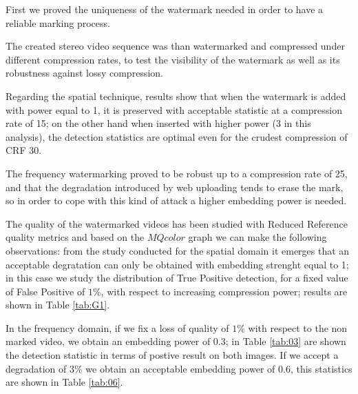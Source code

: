 First we proved the uniqueness of the watermark needed in order to have a reliable marking process.

The created stereo video sequence was than watermarked and compressed under different compression rates, to test the visibility of the watermark as well as its robustness against lossy compression.

Regarding the spatial technique, results show that when the watermark is added with power equal to 1, it is preserved with acceptable statistic at a compression rate of 15; on the other hand when inserted with higher power (3 in this analysis), the detection statistics are optimal even for the crudest compression of CRF 30. 

The frequency watermarking proved to be robust up to a compression rate of 25, and that the degradation introduced by web uploading tends to erase the mark, so in order to cope with this kind of attack a higher embedding power is needed.

The quality of the watermarked videos has been studied with Reduced Reference quality metrics \cite{QMETRICS} and based on the $MQcolor$ graph we can make the following observations: from the study conducted for the spatial domain it emerges that an acceptable degratation can only be obtained with embedding strenght equal to 1; in this case we study the distribution of True Positive detection, for a fixed value of False Positive of $1\%$, with respect to increasing compression power; results are shown in Table \ref{tab:G1}.

In the frequency domain, if we fix a loss of quality of $1\%$ with respect to the non marked video, we obtain an embedding power of $0.3$; in Table \ref{tab:03} are shown the detection statistic in terms of postive result on both images. If we accept a degradation of $3\%$ we obtain an acceptable embedding power of $0.6$, this statistics are shown in Table  \ref{tab:06}. 



\begin{table}[h!]
\begin{center}
\caption{Spatial detection statistic for a quality degradation of $1\%$ and accepted fall-out of $1\%$. \label{tab:G1}}
\end{center}
\end{table}
 
